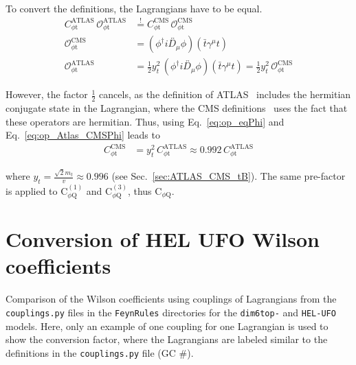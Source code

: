 \documentclass[letterpaper,11pt]{article}
\begin{document}

To convert the definitions, the Lagrangians have to be equal.
\begin{align}
	C_{\phi\text{t}}^\text{ATLAS}\,\mathcal{O}^\text{ATLAS}_{\phi\text{t}} &\stackrel{!}{=} C_{\phi\text{t}}^\text{CMS}\,\mathcal{O}^\text{CMS}_{\phi\text{t}}\label{eq:op_eqPhi}\\
	\mathcal{O}^\text{CMS}_{\phi\text{t}} &= (\phi^\dag i\overleftrightarrow{D_\mu}\phi)(\bar{t}\gamma^\mu t)\\
	\mathcal{O}^\text{ATLAS}_{\phi\text{t}} &= \frac{1}{2}y_t^2\,(\phi^\dag i\overleftrightarrow{D_\mu}\phi)(\bar{t}\gamma^\mu t) = \frac{1}{2}y_t^2\,\mathcal{O}^\text{CMS}_{\phi\text{t}}\label{eq:op_Atlas_CMSPhi}
\end{align}

\noindent
However, the factor $\frac{1}{2}$ cancels, as the definition of ATLAS~\cite{Bylund:2016phk} includes the hermitian conjugate state in the Lagrangian, where the CMS definitions~\cite{AguilarSaavedra:2018nen} uses the fact that these operators are hermitian.
Thus, using Eq.~\ref{eq:op_eqPhi} and Eq.~\ref{eq:op_Atlas_CMSPhi} leads to
\begin{align}
	C_{\phi\text{t}}^\text{CMS} &= y_t^2\,C_{\phi\text{t}}^\text{ATLAS} \approx 0.992\,C_{\phi\text{t}}^\text{ATLAS}
\end{align}

\noindent
where $y_t=\frac{\sqrt{2}m_t}{v}\approx 0.996$ (see Sec.~\ref{sec:ATLAS_CMS_tB}).
The same pre-factor is applied to C$_{\phi\text{Q}}^{(1)}$ and C$_{\phi\text{Q}}^{(3)}$, thus C$_{\phi\text{Q}}$.\\

\noindent
{}



\clearpage

\section{Conversion of HEL UFO Wilson coefficients}
Comparison of the Wilson coefficients using couplings of Lagrangians from the \texttt{couplings.py} files in the \texttt{FeynRules} directories for the \texttt{dim6top-} and \texttt{HEL-UFO} models. 
Here, only an example of one coupling for one Lagrangian is used to show the conversion factor, where the Lagrangians are labeled similar to the definitions in the \texttt{couplings.py} file (GC \#).
\end{document}
